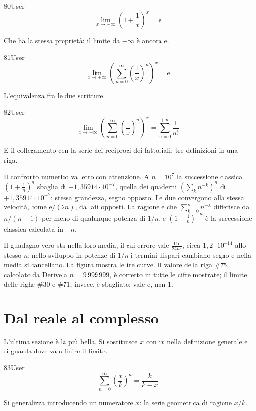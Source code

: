 \begin{espr}{80}{User}{\verificata}
\[
\lim_{x \to -\infty} \left(1 + \frac{1}{x}\right)^{x} = \mathrm{e}
\]
\end{espr}
Che ha la stessa proprietà: il limite da $-\infty$ è ancora $\mathrm{e}$.

\begin{espr}{81}{User}{\verificata}
\[
\lim_{x \to +\infty} \left(\sum_{n=0}^{\infty} \left(\frac{1}{x}\right)^{n}\right)^{x} = \mathrm{e}
\]
\end{espr}
L'equivalenza fra le due scritture.

\begin{espr}{82}{User}{\verificata}
\[
\lim_{x \to +\infty} \left(\sum_{n=0}^{\infty} \left(\frac{1}{x}\right)^{n}\right)^{x} = \sum_{n=0}^{+\infty} \frac{1}{n!}
\]
\end{espr}
E il collegamento con la serie dei reciproci dei fattoriali: tre definizioni in una riga.


Il confronto numerico va letto con attenzione. A $n=10^7$ la successione classica $\left(1+\tfrac1n\right)^n$ sbaglia di $-1{,}35914\cdot10^{-7}$, quella dei quaderni $\left(\sum_k n^{-k}\right)^n$ di $+1{,}35914\cdot10^{-7}$: stessa grandezza, segno opposto. Le due convergono alla stessa velocità, come $\mathrm{e}/(2n)$, da lati opposti. La ragione è che $\sum_{k=0}^{n}n^{-k}$ differisce da $n/(n-1)$ per meno di qualunque potenza di $1/n$, e $\left(1-\tfrac1n\right)^{-n}$ è la successione classica calcolata in $-n$.

Il guadagno vero sta nella loro media, il cui errore vale $\frac{11\mathrm{e}}{24n^2}$, circa $1{,}2\cdot10^{-14}$ allo stesso $n$: nello sviluppo in potenze di $1/n$ i termini dispari cambiano segno e nella media si cancellano. La figura mostra le tre curve. Il valore della riga $\#75$, calcolato da Derive a $n=9\,999\,999$, è corretto in tutte le cifre mostrate; il limite delle righe $\#30$ e $\#71$, invece, è sbagliato: vale $\mathrm{e}$, non $1$.

\section{Dal reale al complesso}

L'ultima sezione è la più bella. Si sostituisce $x$ con $\mathrm{i}x$ nella definizione generale e si guarda dove va a finire il limite.

\begin{espr}{83}{User}{\verificata}
\[
\sum_{n=0}^{\infty} \left(\frac{x}{k}\right)^{n} = \frac{k}{k - x}
\]
\end{espr}
Si generalizza introducendo un numeratore $x$: la serie geometrica di ragione $x/k$.

